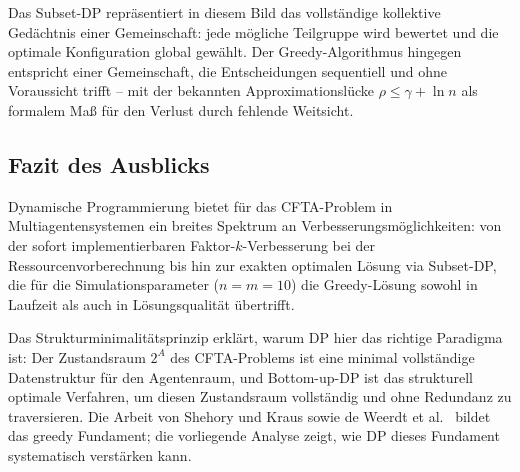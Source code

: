 ﻿\documentclass[a4paper,12pt]{article}
\theoremstyle{definition}
\begin{document}
Das Subset-DP repr\"{a}sentiert in diesem Bild das vollst\"{a}ndige kollektive
Ged\"{a}chtnis einer Gemeinschaft: jede m\"{o}gliche Teilgruppe wird bewertet
und die optimale Konfiguration global gew\"{a}hlt. Der Greedy-Algorithmus
hingegen entspricht einer Gemeinschaft, die Entscheidungen sequentiell und
ohne Voraussicht trifft -- mit der bekannten Approximationsl\"{u}cke
$\rho \leq \gamma + \ln n$ als formalem Ma{\ss} f\"{u}r den Verlust durch fehlende
Weitsicht.

\subsection{Fazit des Ausblicks}

Dynamische Programmierung bietet f\"{u}r das CFTA-Problem in Multiagentensystemen
ein breites Spektrum an Verbesserungsm\"{o}glichkeiten: von der sofort
implementierbaren Faktor-$k$-Verbesserung bei der Ressourcenvorberechnung bis
hin zur exakten optimalen L\"{o}sung via Subset-DP, die f\"{u}r die
Simulationsparameter ($n = m = 10$) die Greedy-L\"{o}sung sowohl in Laufzeit
als auch in L\"{o}sungsqualit\"{a}t \"{u}bertrifft.

Das Strukturminimalit\"{a}tsprinzip \cite{epp2026struktur} erkl\"{a}rt, warum DP
hier das richtige Paradigma ist: Der Zustandsraum $2^A$ des CFTA-Problems ist
eine minimal vollst\"{a}ndige Datenstruktur f\"{u}r den Agentenraum, und
Bottom-up-DP ist das strukturell optimale Verfahren, um diesen Zustandsraum
vollst\"{a}ndig und ohne Redundanz zu traversieren. Die Arbeit von Shehory und
Kraus \cite{sk98} sowie de Weerdt et al.\ \cite{dwzk07} bildet das greedy
Fundament; die vorliegende Analyse zeigt, wie DP dieses Fundament systematisch
verst\"{a}rken kann.
\end{document}
